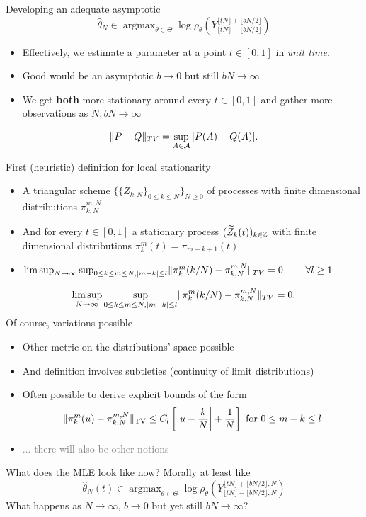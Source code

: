 \begin{frame}{Developing an adequate asymptotic}
	\small
	\[
	\hat{\theta}_N \in \operatorname{argmax}_{\theta \in \Theta} \log \rho_\theta(Y_{\lfloor tN \rfloor - \lfloor bN / 2 \rfloor}^{\lfloor tN \rfloor + \lfloor bN / 2 \rfloor})
	\]
	\normalsize
	\begin{itemize}
		\item Effectively, we estimate a parameter at a point $t \in [0,1]$ in \textit{unit time}. 
		\item Good would be an asymptotic $b \to 0$ but still $bN \to \infty$. 
		\item We get \textbf{both} more stationary around every $t \in [0,1]$ and gather more observations as $N, bN \to \infty$
		\pause 
	\end{itemize}
	\vspace*{0.1cm}
\small
\textcolor{blue}{\[\lVert P-Q\rVert_{TV} = \sup_{A \in \mathcal{A}} |P(A) - Q(A)|.\]}
\vspace*{-0.3cm}
\begin{definitionblockname}{First (heuristic) definition for local stationarity}
\begin{itemize}
		\item A triangular scheme $\{\{Z_{k,N}\}_{0 \leq k \leq N}\}_{N \geq 0}$ of processes with finite dimensional distributions $\pi_{k,N}^{m,N}$
		\item And for every $t \in [0,1]$ a stationary process $(\widetilde{Z}_{k}(t))_{k \in \mathbb{Z}}$ with finite dimensional distributions $\pi_{k}^m(t) = \pi_{m-k+1}(t)$
		\item $\limsup_{N \to \infty} \sup_{0 \leq k \leq m \leq N, |m-k| \leq l } \lVert\pi_{k}^m(k/N) - \pi_{k,N}^{m,N}\rVert_{TV} = 0 \qquad \;\forall l \geq 1$ 
	\end{itemize}
\end{definitionblockname}
\end{frame}

\begin{frame}
	\small
	\[ \limsup_{N \to \infty} \sup_{0 \leq k \leq m \leq N, |m-k| \leq l } \lVert\pi_{k}^m(k/N) - \pi_{k,N}^{m,N}\rVert_{TV} = 0.\]
	\normalsize
	Of course, variations possible 
	\begin{itemize}
		\item Other metric on the distributions' space possible
		\item And definition involves subtleties (continuity of limit distributions)
		\item Often possible to derive explicit bounds of the form \[
		\lVert\pi_k^m(u) - \pi_{k,N}^{m,N}\rVert_{\text{TV}} \leq C_l \left[\left|u- \frac{k}{N}\right| + \frac{1}{N}\right] \text{ for } 0 \leq m-k \leq l 
		\]
		\pause
		\item \textcolor{gray}{... there will also be other notions}
	\end{itemize}
	\pause
	What does the MLE look like now? Morally at least like
\[
\hat{\theta}_N(t) \in \operatorname{argmax}_{\theta \in \Theta} \log \rho_\theta(Y_{\lfloor tN \rfloor - \lfloor bN / 2 \rfloor, N}^{\lfloor tN \rfloor + \lfloor bN / 2 \rfloor,N})
\]
What happens as $N \to \infty$, $b \to 0$ but yet still $bN \to \infty$?
\end{frame}
